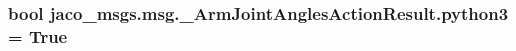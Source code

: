 \subsubsection[{\texorpdfstring{python3}{python3}}]{\setlength{\rightskip}{0pt plus 5cm}bool jaco\+\_\+msgs.\+msg.\+\_\+\+Arm\+Joint\+Angles\+Action\+Result.\+python3 = True}\hypertarget{namespacejaco__msgs_1_1msg_1_1__ArmJointAnglesActionResult_ab284ada115eb325ebae51be3853f1d59}{}\label{namespacejaco__msgs_1_1msg_1_1__ArmJointAnglesActionResult_ab284ada115eb325ebae51be3853f1d59}
